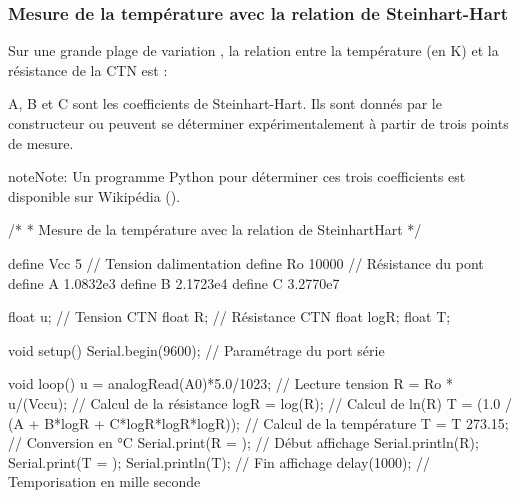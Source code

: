 \documentclass[a4paper,10pt,french]{book}
\let\sphinxpxdimen\pdfpxdimen\else\newdimen\sphinxpxdimen
\begin{document}
\subsubsection{Mesure de la température avec la relation de Steinhart-Hart}
\label{\detokenize{4_lycee/1_seconde_ctn:mesure-de-la-temperature-avec-la-relation-de-steinhart-hart}}
Sur une grande plage de variation , la relation entre la température (en K) et la résistance de la CTN est :

\noindent{\hspace*{\fill}\sphinxincludegraphics[width=254.00000\sphinxpxdimen,height=49.00000\sphinxpxdimen]{{cnt_formule_3}.png}\hspace*{\fill}}

A, B et C sont les coefficients de Steinhart-Hart. Ils sont donnés par le constructeur
ou peuvent se déterminer expérimentalement à partir de trois points de mesure.

\begin{sphinxadmonition}{note}{Note:}
Un programme Python pour déterminer ces trois coefficients est disponible sur Wikipédia ().
\end{sphinxadmonition}

\begin{sphinxVerbatim}[commandchars=\\\{\}]
/*
 * Mesure de la température avec la relation de Steinhart\PYGZhy{}Hart
 */

\PYGZsh{}define Vcc 5       // Tension d\PYGZsq{}alimentation
\PYGZsh{}define Ro  10000   // Résistance du pont
\PYGZsh{}define A   1.0832e\PYGZhy{}3
\PYGZsh{}define B   2.1723e\PYGZhy{}4
\PYGZsh{}define C   3.2770e\PYGZhy{}7

float u;   // Tension CTN
float R;   // Résistance CTN
float logR;
float T;


void setup() \PYGZob{}
   Serial.begin(9600);  // Paramétrage du port série
\PYGZcb{}

void loop() \PYGZob{}
   u = analogRead(A0)*5.0/1023;                  // Lecture tension
   R = Ro * u/(Vcc\PYGZhy{}u);                           // Calcul de la résistance
   logR = log(R);                                // Calcul de ln(R)
   T = (1.0 / (A + B*logR + C*logR*logR*logR));  // Calcul de la température
   T = T \PYGZhy{} 273.15;                               // Conversion en °C
   Serial.print(\PYGZdq{}R = \PYGZdq{});                         // Début affichage
   Serial.println(R);
   Serial.print(\PYGZdq{}T = \PYGZdq{});
   Serial.println(T);                            // Fin affichage
   delay(1000);                                  // Temporisation en mille seconde
\PYGZcb{}
\end{sphinxVerbatim}
\end{document}

